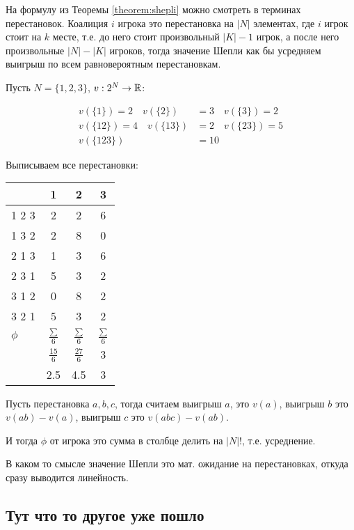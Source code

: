 \documentclass[../main.tex]{subfiles}
\begin{document}
На формулу из Теоремы \ref{theorem:shepli} можно смотреть в терминах перестановок.
Коалиция $i$ игрока это перестановка на  $|N|$ элементах, где  $i$ игрок стоит на  $k$ месте, т.е. до него стоит произвольный  $|K| - 1$ игрок, а после него произвольные $|N| - |K|$ игроков, тогда значение Шепли как бы усредняем выигрыш по всем равновероятным перестановкам.


 \begin{exmpl}
	 Пусть $N = \{1, 2, 3\}$,  $v : 2^{N} \to \mathbb{R}$:

	 \begin{align*}
		 v(\{1\}) = 2 \quad v(\{2\}) &= 3 \quad v(\{3\}) = 2 \\
		 v(\{12\}) = 4 \quad v(\{13\}) &= 2 \quad v(\{23\}) = 5 \\
		 v(\{123\}) &= 10
 	 \end{align*}

	 Выписываем все перестановки:


		{ \centering
\renewcommand{\arraystretch}{1.3}
			\begin{tabular}{l|ccc}
			  & 1 & 2 & 3\\
			  \hline
				1 2 3  & 2 & 2 & 6 \\
				1 3 2 & 2 & 8 & 0 \\
				2 1 3 & 1 & 3 &  6\\
				2 3 1 & 5 & 3 & 2\\
				3 1 2 & 0 & 8 & 2 \\
				3 2 1 & 5 & 3 & 2 \\
				$\phi$ &  $\frac{\sum}{6}$ & $\frac{\sum}{6}$ & $\frac{\sum}{6}$ \\
					   & $\frac{15}{6}$ & $\frac{27}{6}$ & $3$ \\
					   & 2.5 & 4.5 & 3
			\end{tabular}\par
		}

		Пусть перестановка $a, b, c$, тогда считаем выигрыш  $a$, это $v(a)$, выигрыш  $b$ это  $v(ab) - v(a)$, выигрыш  $c$ это  $v(abc) - v(ab)$. 

		И тогда $\phi$ от игрока это сумма в столбце делить на  $|N|!$, т.е. усреднение.

		В каком то смысле значение Шепли это мат. ожидание на перестановках, откуда сразу выводится линейность.

	 
\end{exmpl}

\subsection{Тут что то другое уже пошло}
\end{document}
